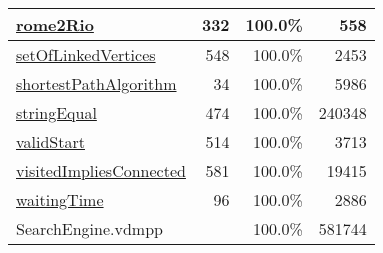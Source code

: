 \begin{longtable}{|l|r|r|r|}
\hline
\hyperref[rome2Rio:332]{rome2Rio} & 332&100.0\% & 558 \\
\hline
\hyperref[setOfLinkedVertices:548]{setOfLinkedVertices} & 548&100.0\% & 2453 \\
\hline
\hyperref[shortestPathAlgorithm:34]{shortestPathAlgorithm} & 34&100.0\% & 5986 \\
\hline
\hyperref[stringEqual:474]{stringEqual} & 474&100.0\% & 240348 \\
\hline
\hyperref[validStart:514]{validStart} & 514&100.0\% & 3713 \\
\hline
\hyperref[visitedImpliesConnected:581]{visitedImpliesConnected} & 581&100.0\% & 19415 \\
\hline
\hyperref[waitingTime:96]{waitingTime} & 96&100.0\% & 2886 \\
\hline
\hline
SearchEngine.vdmpp & & 100.0\% & 581744 \\
\hline
\end{longtable}

